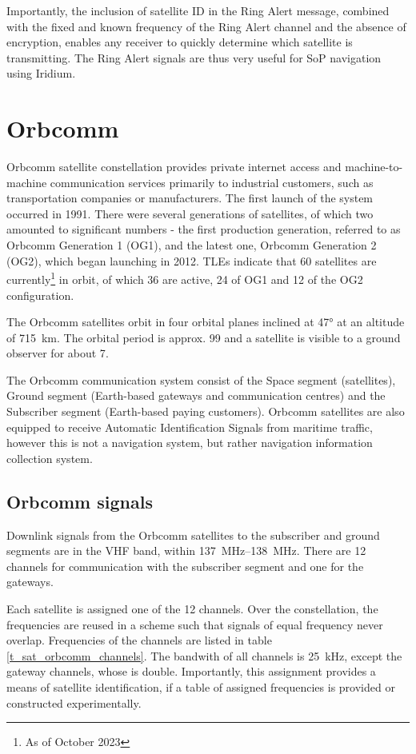 Importantly, the inclusion of satellite ID in the Ring Alert message, combined with the fixed and known frequency of the Ring Alert channel and the absence of encryption, enables any receiver to quickly determine which satellite is transmitting. The Ring Alert signals are thus very useful for SoP navigation using Iridium.


\section{Orbcomm}
Orbcomm satellite constellation provides private internet access and machine-to-machine communication services primarily to industrial customers, such as transportation companies or manufacturers. The first launch of the system occurred in 1991. There were several generations of satellites, of which two amounted to significant numbers - the first production generation, referred to as Orbcomm Generation 1 (OG1), and the latest one, Orbcomm Generation 2 (OG2), which began launching in 2012. TLEs indicate that 60 satellites are currently\footnote{As of October 2023} in orbit, of which 36 are active, 24 of OG1 and 12 of the OG2 configuration\cite{sat12}.

The Orbcomm satellites orbit in four orbital planes inclined at \ang{47} at an altitude of \qty{715}{km}. The orbital period is approx. \qty{99}{\min} and a satellite is visible to a ground observer for about \qty{7}{\min}\cite{sat11, sop08}. %

The Orbcomm communication system consist of the Space segment (satellites), Ground segment (Earth-based gateways and communication centres) and the Subscriber segment (Earth-based paying customers)\cite{sop08}. Orbcomm satellites are also equipped to receive Automatic Identification Signals from maritime traffic, however this is not a navigation system, but rather navigation information collection system\cite{sat11}.

\subsection{Orbcomm signals}
Downlink signals from the Orbcomm satellites to the subscriber and ground segments are in the VHF band, within \qtyrange{137}{138}{MHz}. There are 12 channels for communication with the subscriber segment and one for the gateways\cite{sop08}.

Each satellite is assigned one of the 12 channels. Over the constellation, the frequencies are reused in a scheme such that signals of equal frequency never overlap. Frequencies of the channels are listed in table \ref{t_sat_orbcomm_channels}. The bandwith of all channels is \qty{25}{kHz}, except the gateway channels, whose is double\cite{sat13}. Importantly, this assignment provides a means of satellite identification, if a table of assigned frequencies is provided or constructed experimentally.


